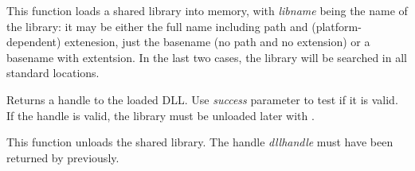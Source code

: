 This function loads a shared library into memory, with {\it libname} being the
name of the library: it may be either the full name including path and
(platform-dependent) extenesion, just the basename (no path and no extension)
or a basename with extentsion. In the last two cases, the library will be
searched in all standard locations.

Returns a handle to the loaded DLL. Use {\it success} parameter to test if it
is valid. If the handle is valid, the library must be unloaded later with 
.




\label{wxdllloaderunloadlibrary}


This function unloads the shared library. The handle {\it dllhandle} must have
been returned by  previously.

